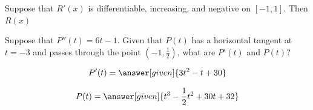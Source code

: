 \documentclass[handout]{ximera}
\begin{document}
\begin{problem}
Suppose that $R'(x)$ is differentiable, increasing, and negative on $[-1,1]$. Then $R(x)$


\begin{multipleChoice}
\end{multipleChoice}
\end{problem}


\begin{problem}
Suppose that $P''(t)=6t-1$. Given that $P(t)$ has a horizontal tangent at $t=-3$ and passes through the point $(-1,\frac{1}{2})$, what are $P'(t)$ and $P(t)$?
\begin{question}
	\[
	\displaystyle P'(t) =    \answer[given]{3t^{2}-t+30 }
	\]
\end{question}

\begin{question}
	\[
	\displaystyle P(t) =    \answer[given]{t^{3}-\frac{1}{2}t^{2}+30t+ 32}
	\]
\end{question}
\end{problem}
\end{document}

